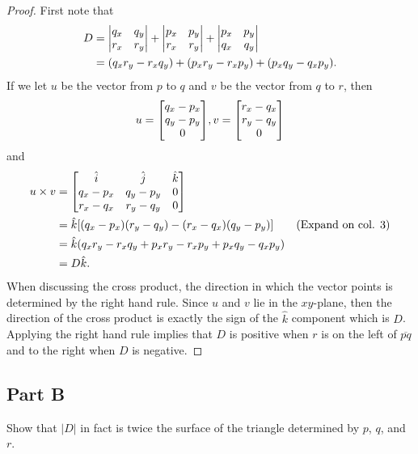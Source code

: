 \documentclass{eeleyes}
\begin{document}
\begin{proof}
    First note that
    \begin{align*}
        D &=
        \mqty|
            q_x & q_y \\
            r_x & r_y \\
        | + 
        \mqty|
            p_x & p_y \\
            r_x & r_y \\
        | + 
        \mqty|
            p_x & p_y \\
            q_x & q_y \\
        | \\
        &= (q_x r_y - r_x q_y) + (p_x r_y - r_x p_y) + (p_x q_y - q_x p_y).
    \end{align*}
    If we let $u$ be the vector from $p$ to $q$ and $v$ be the vector from $q$ to $r$, then
    \[
        u = \mqty[q_x - p_x \\ q_y - p_y \\ 0], v = \mqty[r_x - q_x \\ r_y - q_y \\ 0]
    \]
    and
    \begin{align*}
        u \times v &= \mqty[
            \hat{i} & \hat{j} & \hat{k} \\
            q_x - p_x & q_y - p_y & 0 \\
            r_x - q_x & r_y - q_y & 0 \\
            ] \\
                      &= \hat{k} \qty[(q_x - p_x)(r_y - q_y) - (r_x - q_x)(q_y - p_y)] \tag{Expand on col. 3} \\
      &= \hat{k} \qty(q_x r_y - r_x q_y + p_x r_y - r_x p_y + p_x q_y - q_x p_y) \\
      &= D \hat{k}.
    \end{align*}
    When discussing the cross product, the direction in which the vector points is determined by the right hand rule. Since $u$ and $v$ lie in the $xy$-plane, then the direction of the cross product is exactly the sign of the $\hat{k}$ component which is $D$. Applying the right hand rule implies that $D$ is positive when $r$ is on the left of $\overline{pq}$ and to the right when $D$ is negative.
\end{proof}

\begin{problem}
    \subsection*{Part B}
    Show that $|D|$ in fact is twice the surface of the triangle determined by $p$, $q$, and $r$.
\end{problem}
\end{document}

